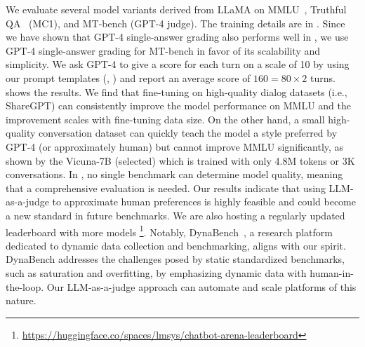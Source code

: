 We evaluate several model variants derived from LLaMA on MMLU~\cite{hendrycks2020measuring}, Truthful QA~\cite{lin2021truthfulqa} (MC1), and MT-bench (GPT-4 judge). The training details are in .
Since we have shown that GPT-4 single-answer grading also performs well in , we use GPT-4 single-answer grading for MT-bench in favor of its scalability and simplicity.
We ask GPT-4 to give a score for each turn on a scale of 10 by using our prompt templates (, ) and report an average score of $160=80 \times 2$ turns. 
 shows the results.
We find that fine-tuning on high-quality dialog datasets (i.e., ShareGPT) can consistently improve the model performance on MMLU and the improvement scales with fine-tuning data size.
On the other hand, a small high-quality conversation dataset can quickly teach the model a style preferred by GPT-4 (or approximately human) but cannot improve MMLU significantly, as shown by the Vicuna-7B (selected) which is trained with only 4.8M tokens or 3K conversations. In , no single benchmark can determine model quality, meaning that a comprehensive evaluation is needed. Our results indicate that using LLM-as-a-judge to approximate human preferences is highly feasible and could become a new standard in future benchmarks. We are also hosting a regularly updated leaderboard with more models \footnote{\url{https://huggingface.co/spaces/lmsys/chatbot-arena-leaderboard}}.
Notably, DynaBench~\cite{kiela2021dynabench}, a research platform dedicated to dynamic data collection and benchmarking, aligns with our spirit. DynaBench addresses the challenges posed by static standardized benchmarks, such as saturation and overfitting, by emphasizing dynamic data with human-in-the-loop. Our LLM-as-a-judge approach can automate and scale platforms of this nature.




